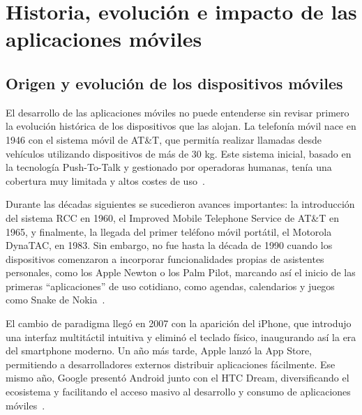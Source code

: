 

\section{Historia, evolución e impacto de las aplicaciones móviles}

\subsection{Origen y evolución de los dispositivos móviles}
\vspace{-1.5ex}

El desarrollo de las aplicaciones móviles no puede entenderse sin revisar primero la evolución histórica de los dispositivos que las alojan. La telefonía móvil nace en 1946 con el sistema móvil de AT\&T, que permitía realizar llamadas desde vehículos utilizando dispositivos de más de 30 kg. Este sistema inicial, basado en la tecnología Push-To-Talk y gestionado por operadoras humanas, tenía una cobertura muy limitada y altos costes de uso~\cite{agar2004}.



Durante las décadas siguientes se sucedieron avances importantes: la introducción del sistema RCC en 1960, el Improved Mobile Telephone Service de AT\&T en 1965, y finalmente, la llegada del primer teléfono móvil portátil, el Motorola DynaTAC, en 1983. Sin embargo, no fue hasta la década de 1990 cuando los dispositivos comenzaron a incorporar funcionalidades propias de asistentes personales, como los Apple Newton o los Palm Pilot, marcando así el inicio de las primeras ``aplicaciones'' de uso cotidiano, como agendas, calendarios y juegos como Snake de Nokia~\cite{west2010}.

El cambio de paradigma llegó en 2007 con la aparición del iPhone, que introdujo una interfaz multitáctil intuitiva y eliminó el teclado físico, inaugurando así la era del smartphone moderno. Un año más tarde, Apple lanzó la App Store, permitiendo a desarrolladores externos distribuir aplicaciones fácilmente. Ese mismo año, Google presentó Android junto con el HTC Dream, diversificando el ecosistema y facilitando el acceso masivo al desarrollo y consumo de aplicaciones móviles~\cite{murphy2014}.

